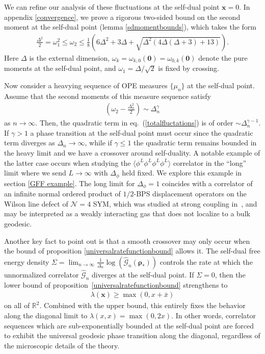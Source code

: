 \documentclass[a4paper,11pt]{article}
\theoremstyle{plain}
\theoremstyle{definition}
\theoremstyle{remark}
\newcommand{\bs}[1]{\boldsymbol{#1}}
\newcommand{\ba}{\begin{equation} \begin{aligned}}
\newcommand{\ea}{\end{aligned} \end{equation}}
\newcommand{\Df}{\Delta_\phi}
\newcommand{\De}{\Delta}
\begin{document}
We can refine our analysis of these fluctuations at the self-dual point $\bs{x} = 0$. In appendix \ref{convergence}, we prove a rigorous two-sided bound on the second moment at the self-dual point (lemma \ref{sdmomentbounds}), which takes the form
\ba
\frac{\De^2}{2} = \omega_1^2 \leq \omega_2 \leq \frac{1}{8}\left(6\De^2 + 3\De + \sqrt{\De^2(4\De(\De+3)+13)}\right).
\ea
Here $\De$ is the external dimension, $\omega_k = \omega_{k,0}(\bs{0}) =\omega_{0,k}(\bs{0})$ denote the pure moments at the self-dual point, and $\omega_1 = \De/\sqrt{2}$ is fixed by crossing. 

Now consider a heavying sequence of OPE measures $\{\mu_n\}$ at the self-dual point. Assume that the second moments of this measure sequence satisfy
\ba
\left(\omega_2 -\frac{\De_n^2}{2}\right) \sim \De_n^\gamma
\ea
as $n\to\infty$. Then, the quadratic term in eq.~(\ref{totalfluctations}) is of order $\sim\De_n^{\gamma -1}$. If $\gamma > 1$ a phase transition at the self-dual point must occur since the quadratic term diverges as $\De_n \to \infty$, while if $\gamma \leq1$ the quadratic term remains bounded in the heavy limit and we have a crossover around self-duality. A notable example of the latter case occurs when studying the $\langle \phi^L \phi^L \phi^L \phi^L\rangle$ correlator in the ``long'' limit where we send $L\to\infty$ with $\Df$ held fixed. We explore this example in section \ref{GFF example}. The long limit for $\Df =1$ coincides with a correlator of an infinite normal ordered product of $1/2$-BPS displacement operators on the Wilson line defect of $\mathcal{N}=4$ SYM, which was studied at strong coupling in~\cite{ferrero2}, and may be interpreted as a weakly interacting gas that does not localize to a bulk geodesic.
 
Another key fact to point out is that a smooth crossover may only occur when the bound of proposition \ref{universalratefunctionbound} allows it. The self-dual free energy density $\Sigma = \lim_{n\to\infty} \frac{1}{\De_n}\log(\widehat{\mathcal{G}}_n(\bs{\rho}_*))$ controls the rate at which the unnormalized correlator $\widehat{\mathcal{G}}_n$ diverges at the self-dual point. If $\Sigma = 0$, then the lower bound of proposition~\ref{universalratefunctionbound} strengthens to
\ba
\lambda(\bs{x}) \geq \max(0, x + \bar{x})
\ea
on all of $\mathbb{R}^2$. Combined with the upper bound, this entirely fixes the behavior along the diagonal limit to $\lambda(x,x) = \max(0,2x)$. In other words, correlator sequences which are sub-exponentially bounded at the self-dual point are forced to exhibit the universal geodesic phase transition along the diagonal, regardless of the microscopic details of the theory. 
\end{document}
